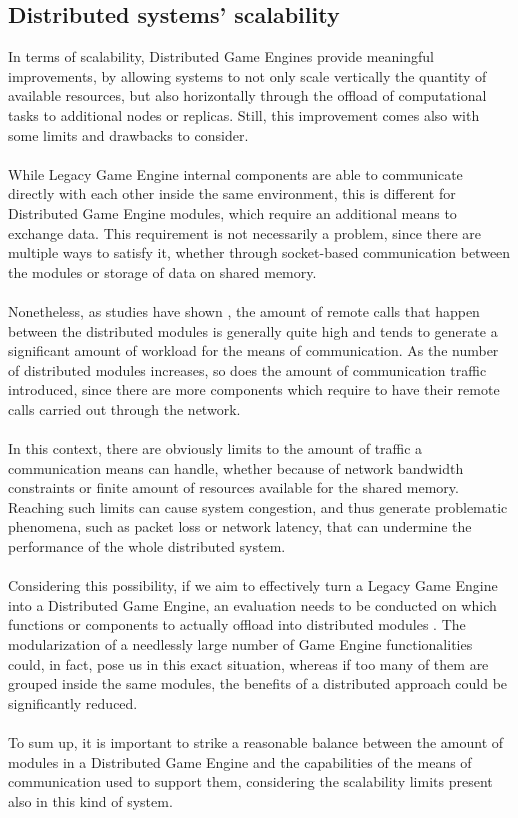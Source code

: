 \subsection{Distributed systems' scalability}
In terms of scalability, Distributed Game Engines provide meaningful improvements, by allowing systems to not only scale vertically the quantity of available resources, but also horizontally through the offload of computational tasks to additional nodes or replicas. Still, this improvement comes also with some limits and drawbacks to consider. \\ \\
While Legacy Game Engine internal components are able to communicate directly with each other inside the same environment, this is different for Distributed Game Engine modules, which require an additional means to exchange data. This requirement is not necessarily a problem, since there are multiple ways to satisfy it, whether through socket-based communication between the modules or storage of data on shared memory. \\ \\ Nonetheless, as studies have shown \cite{womak:tame-efficient-task-allocation, womak:rafting-multiplayer-games, womak:distributed-minecraft}, the amount of remote calls that happen between the distributed modules is generally quite high and tends to generate a significant amount of workload for the means of communication. As the number of distributed modules increases, so does the amount of communication traffic introduced, since there are more components which require to have their remote calls carried out through the network. \\ \\
In this context, there are obviously limits to the amount of traffic a communication means can handle, whether because of network bandwidth constraints or finite amount of resources available for the shared memory. Reaching such limits can cause system congestion, and thus generate problematic phenomena, such as packet loss or network latency, that can undermine the performance of the whole distributed system. \\ \\
Considering this possibility, if we aim to effectively turn a Legacy Game Engine into a Distributed Game Engine, an evaluation needs to be conducted on which functions or components to actually offload into distributed modules \cite{womak:performance-analysis-game-engine}. The modularization of a needlessly large number of Game Engine functionalities could, in fact, pose us in this exact situation, whereas if too many of them are grouped inside the same modules, the benefits of a distributed approach could be significantly reduced. \\ \\
To sum up, it is important to strike a reasonable balance between the amount of modules in a Distributed Game Engine and the capabilities of the means of communication used to support them, considering the scalability limits present also in this kind of system.

